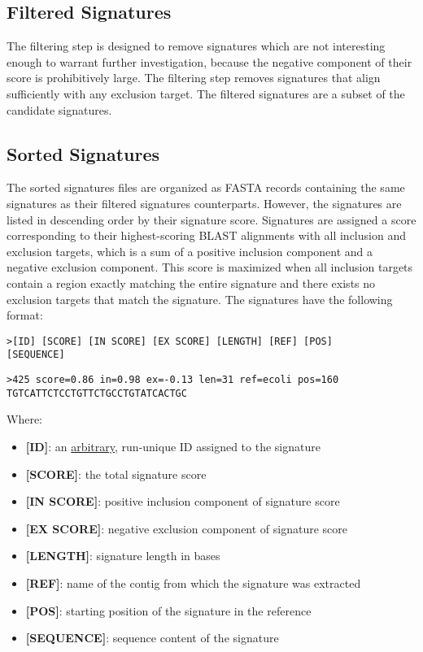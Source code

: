 \documentclass[a4paper,10pt]{article}
\begin{document}
\subsection{Filtered Signatures}

The filtering step is designed to remove signatures which are not interesting enough to warrant further investigation, because the negative component of their score is prohibitively large. The filtering step removes signatures that align sufficiently with any exclusion target. The filtered signatures are a subset of the candidate signatures.

\subsection{Sorted Signatures}

The sorted signatures files are organized as FASTA records containing the same signatures as their filtered signatures counterparts. However, the signatures are listed in descending order by their signature score. Signatures are assigned a score corresponding to their highest-scoring BLAST alignments with all inclusion and exclusion targets, which is a sum of a positive inclusion component and a negative exclusion component. This score is maximized when all inclusion targets contain a region exactly matching the entire signature and there exists no exclusion targets that match the signature. The signatures have the following format:

\begin{verbatim}
>[ID] [SCORE] [IN SCORE] [EX SCORE] [LENGTH] [REF] [POS]
[SEQUENCE]
\end{verbatim}

\begin{verbatim}
>425 score=0.86 in=0.98 ex=-0.13 len=31 ref=ecoli pos=160
TGTCATTCTCCTGTTCTGCCTGTATCACTGC
\end{verbatim}

Where:

\begin{itemize}
  \item \textbf{[ID]}: an \ul{arbitrary}, run-unique ID assigned to the signature
  \item \textbf{[SCORE]}: the total signature score
  \item \textbf{[IN SCORE]}: positive inclusion component of signature score
  \item \textbf{[EX SCORE]}: negative exclusion component of signature score
  \item \textbf{[LENGTH]}: signature length in bases
  \item \textbf{[REF]}: name of the contig from which the signature was extracted
  \item \textbf{[POS]}: starting position of the signature in the reference
  \item \textbf{[SEQUENCE]}: sequence content of the signature
\end{itemize}
\end{document}
